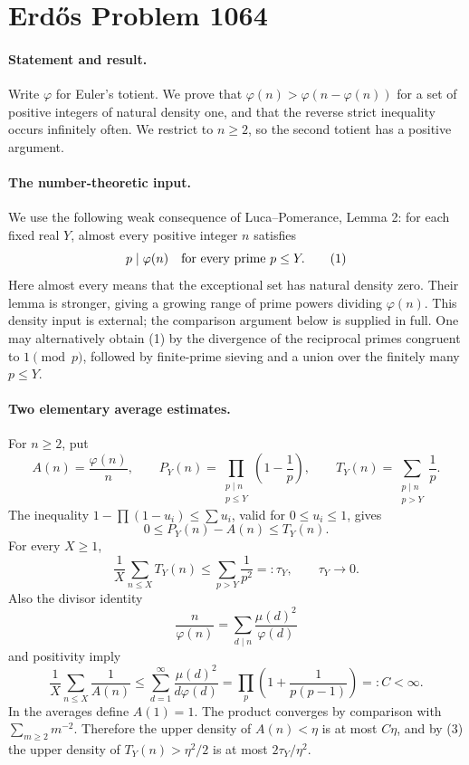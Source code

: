 \section*{Erd\H{o}s Problem 1064}

\paragraph{Statement and result.}
Write \(\varphi\) for Euler's totient. We prove that
\(\varphi(n)>\varphi(n-\varphi(n))\) for a set of positive integers of natural density one, and that the reverse strict inequality occurs infinitely often. We restrict to \(n\geq2\), so the second totient has a positive argument.

\paragraph{The number-theoretic input.}
We use the following weak consequence of Luca--Pomerance, Lemma 2: for each fixed real \(Y\), almost every positive integer \(n\) satisfies
\[
 p\mid\varphi(n)\quad\hbox{for every prime }p\leq Y.
 \tag{1}
\]
Here almost every means that the exceptional set has natural density zero. Their lemma is stronger, giving a growing range of prime powers dividing \(\varphi(n)\). This density input is external; the comparison argument below is supplied in full. One may alternatively obtain (1) by the divergence of the reciprocal primes congruent to \(1\pmod p\), followed by finite-prime sieving and a union over the finitely many \(p\leq Y\).

\paragraph{Two elementary average estimates.}
For \(n\geq2\), put
\[
 A(n)=\frac{\varphi(n)}n,\qquad
 P_Y(n)=\prod_{\substack{p\mid n\\p\leq Y}}\left(1-\frac1p\right),
 \qquad
 T_Y(n)=\sum_{\substack{p\mid n\\p>Y}}\frac1p.
\]
The inequality \(1-\prod(1-u_i)\leq\sum u_i\), valid for \(0\leq u_i\leq1\), gives
\[
 0\leq P_Y(n)-A(n)\leq T_Y(n).
 \tag{2}
\]
For every \(X\geq1\),
\[
 \frac1X\sum_{n\leq X}T_Y(n)
 \leq\sum_{p>Y}\frac1{p^2}=:\tau_Y,
 \qquad \tau_Y\longrightarrow0.
 \tag{3}
\]
Also the divisor identity
\[
 \frac n{\varphi(n)}
 =\sum_{d\mid n}\frac{\mu(d)^2}{\varphi(d)}
\]
and positivity imply
\[
 \frac1X\sum_{n\leq X}\frac1{A(n)}
 \leq\sum_{d=1}^{\infty}\frac{\mu(d)^2}{d\varphi(d)}
 =\prod_p\left(1+\frac1{p(p-1)}\right)=:C<\infty.
 \tag{4}
\]
In the averages define \(A(1)=1\). The product converges by comparison with \(\sum_{m\geq2}m^{-2}\). Therefore the upper density of \(A(n)<\eta\) is at most \(C\eta\), and by (3) the upper density of \(T_Y(n)>\eta^2/2\) is at most \(2\tau_Y/\eta^2\).

